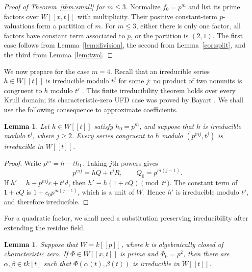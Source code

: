 \documentclass[11pt]{amsart}
\newtheorem{lemma}[theorem]{Lemma}
\theoremstyle{remark}
\begin{document}
\begin{proof}[Proof of Theorem~\ref{thm:small} for $m\leq3$]
Normalize $f_0=p^m$ and list its prime factors over $W[[x,t]]$
with multiplicity. Their positive constant-term $p$-valuations form
a partition of $m$. For $m\leq3$, either there is only one factor,
all factors have constant term associated to $p$, or the partition
is $(2,1)$. The first case follows from Lemma~\ref{lem:division},
the second from Lemma~\ref{cor:split}, and the third from
Lemma~\ref{lem:two}.
\end{proof}

We now prepare for the case $m=4$. Recall that an irreducible series
$h\in W[[t]]$ is irreducible modulo $t^j$ for some $j$: no product
of two nonunits is congruent to $h$ modulo $t^j$
\cite[Theorem~6.4]{JP}. This finite irreducibility theorem holds
over every Krull domain; its characteristic-zero UFD case was proved
by Bayart \cite[\S IV, Th\'eor\`eme~(T)]{Bayart81}.
We shall use the following consequence to approximate coefficients.

\begin{lemma}\label{lem:stability}
Let $h\in W[[t]]$ satisfy $h_0=p^m$, and suppose that $h$ is
irreducible modulo $t^j$, where $j\geq2$. Every series congruent
to $h$ modulo $(p^{mj},t^j)$ is irreducible in $W[[t]]$.
\end{lemma}

\begin{proof}
Write $p^m=h-th_1$. Taking $j$th powers gives
\[
 p^{mj}=hQ+t^jR,\qquad Q_0=p^{m(j-1)}.
\]
If $h'=h+p^{mj}c+t^jd$, then $h'\equiv h(1+cQ)\pmod{t^j}$.
The constant term of $1+cQ$ is $1+c_0p^{m(j-1)}$, which is a
unit of $W$. Hence $h'$ is irreducible modulo $t^j$, and therefore
irreducible.
\end{proof}

For a quadratic factor, we shall need a substitution preserving
irreducibility after extending the residue field.

\begin{lemma}\label{lem:quadratic-odd}
Suppose that $W=k[[p]]$, where $k$ is algebraically closed of
characteristic zero. If $\Phi\in W[[x,t]]$ is prime and
$\Phi_0=p^2$, then there are $\alpha,\beta\in tk[t]$ such that
$\Phi(\alpha(t),\beta(t))$ is irreducible in $W[[t]]$.
\end{lemma}
\end{document}
